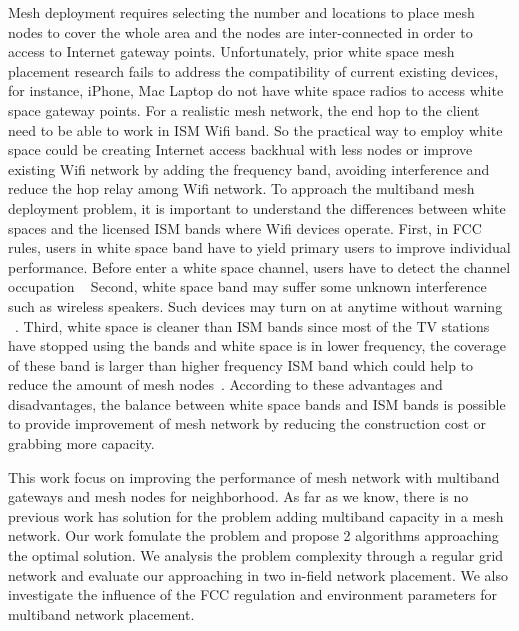 Mesh deployment requires selecting the number and locations to place mesh nodes to cover the whole area and the nodes are inter-connected in order to access to Internet gateway points.
Unfortunately, prior white space mesh placement research fails to address the compatibility of current existing devices, for instance, iPhone, Mac Laptop do not have white space radios to access white space gateway points. For a realistic mesh network, the end hop to the client need to be able to work in ISM Wifi band. 
So the practical way to employ white space could be creating Internet access backhual with less nodes or improve existing Wifi network by adding the frequency band, avoiding interference and reduce the hop relay among Wifi network.
To approach the multiband mesh deployment problem, it is important to understand the differences between white spaces and the licensed ISM bands where Wifi devices operate. 
First, in FCC rules, users in white space band have to yield primary users to improve individual performance.
Before enter a white space channel, users have to detect the channel occupation ~\cite{cuileveraging,liu2012astra}
Second, white space band may suffer some unknown interference such as wireless speakers. Such devices may turn on at anytime without warning ~\cite{nekovee2009survey}.
Third, white space is cleaner than ISM bands since most of the TV stations have stopped using the bands and white space is in lower frequency, the coverage of these band is larger than higher frequency ISM band which could help to reduce the amount of mesh nodes~\cite{liang2008cognitive}.
According to these advantages and disadvantages, the balance between white space bands and ISM bands is possible to provide improvement of mesh network by reducing the construction cost or grabbing more capacity. 



This work focus on improving the performance of mesh network with multiband gateways and mesh nodes for neighborhood. As far as we know, there is no previous work has solution for the problem adding multiband capacity in a mesh network.
Our work fomulate the problem and propose 2 algorithms approaching the optimal solution.
We analysis the problem complexity through a regular grid network and evaluate our approaching in two in-field network placement. We also investigate the influence of the FCC regulation and environment parameters for multiband network placement.

